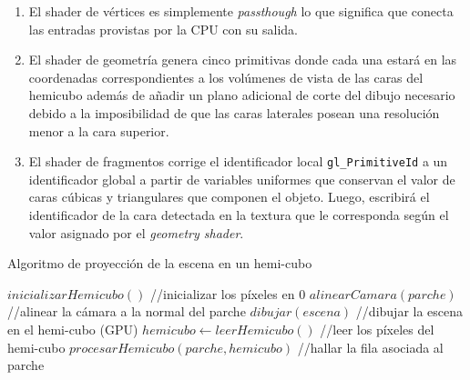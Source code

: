 \begin{enumerate}
	\begin{enumerate}
		\item El shader de vértices es simplemente \textit{passthough} lo que significa que conecta las entradas provistas por la CPU con su salida.
		\item El shader de geometría genera cinco primitivas donde cada una estará en las coordenadas correspondientes a los volúmenes de vista de las caras del hemicubo además de añadir un plano adicional de corte del dibujo necesario debido a la imposibilidad de que las caras laterales posean una resolución menor a la cara superior.
		\item El shader de fragmentos corrige el identificador local \verb|gl_PrimitiveId| a un identificador global a partir de variables uniformes que conservan el valor de caras cúbicas y triangulares que componen el objeto. Luego, escribirá el identificador de la cara detectada en la textura que le corresponda según el valor asignado por el \textit{geometry shader}.
	\end{enumerate}
	\begin{algorithm}

	\caption{Algoritmo de proyección de la escena en un hemi-cubo}
	\label{alg:renderHemicube}
	\fontsize{8}{8}\selectfont
	\begin{algorithmic}
		\State $inicializarHemicubo()$ //inicializar los píxeles en 0
		\State $alinearCamara(parche)$ //alinear la cámara a la normal del parche
		\State $dibujar(escena)$ //dibujar la escena en el hemi-cubo (GPU)
		\State $hemicubo \gets leerHemicubo()$ //leer los píxeles del hemi-cubo
		\State $procesarHemicubo(parche, hemicubo)$ //hallar la fila asociada al parche
		\EndLoop
		\EndFunction
	\end{algorithmic}
\end{algorithm}


\end{enumerate}
